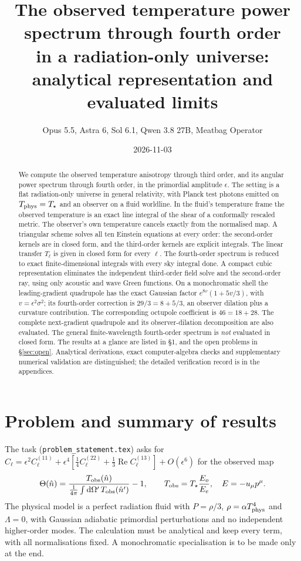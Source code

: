 \documentclass[11pt]{article}
\title{The observed temperature power spectrum through fourth order\\
in a radiation-only universe: analytical representation and evaluated limits}
\author{Opus 5.5, Astra 6, Sol 6.1, Qwen 3.8 27B, Meatbag Operator}
\date{2026-11-03}
\theoremstyle{definition}
\theoremstyle{remark}
\newcommand{\eps}{\epsilon}
\newcommand{\nh}{\hat n}
\newcommand{\dd}{\mathrm{d}}
\newcommand{\code}[1]{\texttt{#1}}
\begin{document}
\maketitle

\begin{abstract}
We compute the observed temperature anisotropy through third order, and its angular power
spectrum through fourth order, in the primordial amplitude $\eps$. The setting is a flat
radiation-only universe in general relativity, with Planck test photons emitted on
$T_{\rm phys}=T_\star$ and an observer on a fluid worldline. In the fluid's temperature frame the
observed temperature is an exact line integral of the shear of a conformally rescaled metric. The
observer's own temperature cancels exactly from the normalised map. A triangular scheme solves all
ten Einstein equations at every order: the second-order kernels are in closed form, and the
third-order kernels are explicit integrals. The linear transfer $T_\ell$ is given in closed form for
every $\ell$. The fourth-order spectrum is reduced to exact finite-dimensional integrals with every
sky integral done. A compact cubic representation eliminates the independent third-order field
solve and the second-order ray, using only acoustic and wave Green functions. On a monochromatic
shell the leading-gradient quadrupole has the exact Gaussian factor $e^{8v}(1+5v/3)$, with
$v=\eps^2\sigma^2$; its fourth-order
correction is $29/3=8+5/3$, an observer dilation plus a curvature contribution. The corresponding
octupole coefficient is $46=18+28$. The complete next-gradient quadrupole and its observer-dilation
decomposition are also evaluated. The general
finite-wavelength fourth-order spectrum is \emph{not} evaluated in closed form. The results at a
glance are listed in \S1, and the open problems in \S\ref{sec:open}. Analytical derivations,
exact computer-algebra checks and supplementary numerical validation are distinguished;
the detailed verification record is in the appendices.
\end{abstract}

\section{Problem and summary of results}\label{sec:summary}

The task (\code{problem\_statement.tex}) asks for $C_\ell=\eps^2C_\ell^{(11)}+\eps^4[\frac14
C_\ell^{(22)}+\frac13\operatorname{Re}C_\ell^{(13)}]+O(\eps^6)$ for the observed map
\[
\Theta(\nh)=\frac{T_{\rm obs}(\nh)}{\frac1{4\pi}\int \dd\Omega'\,T_{\rm obs}(\nh')}-1,\qquad
T_{\rm obs}=T_\star\frac{E_o}{E_e},\quad E=-u_\mu p^\mu .
\]
The physical model is a perfect radiation fluid with $P=\rho/3$, $\rho=\alpha T_{\rm phys}^4$
and $\Lambda=0$, with Gaussian adiabatic primordial perturbations and no independent
higher-order modes. The calculation must be analytical and keep every term, with all
normalisations fixed. A monochromatic specialisation is to be made only at the end.
\end{document}
